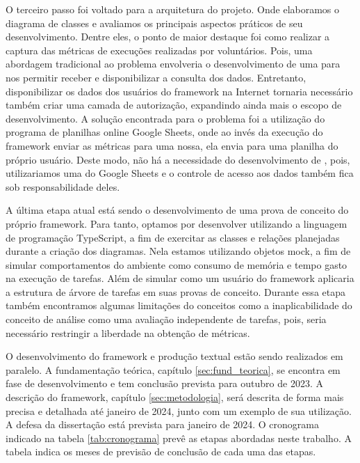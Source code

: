 \documentclass[12pt]{tcc}
\begin{document}
O terceiro passo foi voltado para a arquitetura do projeto.
Onde elaboramos o diagrama de classes e avaliamos os principais aspectos práticos de seu desenvolvimento.
Dentre eles, o ponto de maior destaque foi como realizar a captura das métricas de execuções realizadas por voluntários.
Pois, uma abordagem tradicional ao problema envolveria o desenvolvimento de uma  para nos permitir receber e disponibilizar a consulta dos dados.
Entretanto, disponibilizar os dados dos usuários do framework na Internet tornaria necessário também criar uma camada de autorização, expandindo ainda mais o escopo de desenvolvimento.
A solução encontrada para o problema foi a utilização do programa de planilhas online Google Sheets, onde ao invés da execução do framework enviar as métricas para uma  nossa, ela envia para uma planilha do próprio usuário.
Deste modo, não há a necessidade do desenvolvimento de , pois, utilizariamos uma do Google Sheets e o controle de acesso aos dados também fica sob responsabilidade deles.

A última etapa atual está sendo o desenvolvimento de uma prova de conceito do próprio framework.
Para tanto, optamos por desenvolver utilizando a linguagem de programação TypeScript, a fim de exercitar as classes e relações planejadas durante a criação dos diagramas.
Nela estamos utilizando objetos mock, a fim de simular comportamentos do ambiente como consumo de memória e tempo gasto na execução de tarefas.
Além de simular como um usuário do framework aplicaria a estrutura de árvore de tarefas em suas provas de conceito.
Durante essa etapa também encontramos algumas limitações do conceitos como a inaplicabilidade do conceito de análise como uma avaliação independente de tarefas, pois, seria necessário restringir a liberdade na obtenção de métricas.

O desenvolvimento do framework e produção textual estão sendo realizados em paralelo.
A fundamentação teórica, capítulo \ref{sec:fund_teorica}, se encontra em fase de desenvolvimento e tem conclusão prevista para outubro de 2023.
A descrição do framework, capítulo \ref{sec:metodologia}, será descrita de forma mais precisa e detalhada até janeiro de 2024, junto com um exemplo de sua utilização.
A defesa da dissertação está prevista para janeiro de 2024. O cronograma indicado na tabela \ref{tab:cronograma} prevê as etapas abordadas neste trabalho.
A tabela indica os meses de previsão de conclusão de cada uma das etapas.
\end{document}
